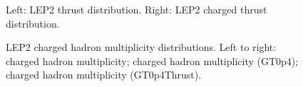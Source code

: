 \begin{figure}[H]
\centering
{}\hfill
{}\hfill %
\caption{Left: LEP2 thrust distribution. Right: LEP2 charged thrust distribution.}
\end{figure}

\begin{figure}[H]
\centering
{}\hfill
{}\hfill
{}\hfill
\caption{LEP2 charged hadron multiplicity distributions. Left to right: charged hadron multiplicity; charged hadron multiplicity (GT0p4); charged hadron multiplicity (GT0p4Thrust).}
\end{figure}

